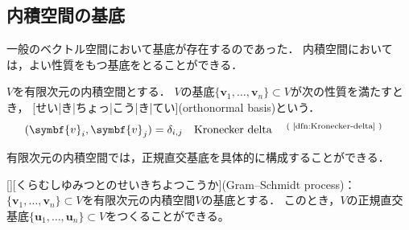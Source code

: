 \documentclass[../sotsu.tex]{subfiles}
\begin{document}
\subsection{内積空間の基底}

一般のベクトル空間において基底が存在するのであった．
内積空間においては，よい性質をもつ基底をとることができる．

\begin{definition}[正規直交基底]
    $V$を有限次元の内積空間とする．
    $V$の基底$ \{ \symbf{v}_1, \dots, \symbf{v}_n \} \subset V$が次の性質を満たすとき，
    [せい|き|ちょっ|こう|き|てい](orthonormal basis)という．
    \begin{equation*}
        (\symbf{v}_i, \symbf{v}_j) = \delta_{i,j} 
            \quad \text{Kronecker delta\refdfn{dfn:Kronecker-delta}}
    \end{equation*}
\end{definition}

有限次元の内積空間では，正規直交基底を具体的に構成することができる．

\begin{theorem}
    [][くらむしゆみつとのせいきちよつこうか](Gram–Schmidt process)：
    $ \{ \symbf{v}_1, \dots, \symbf{v}_n \} \subset V$を有限次元の内積空間$V$の基底とする．
    このとき，$V$の正規直交基底$ \{ \symbf{u}_1, \dots, \symbf{u}_n \} \subset V$をつくることができる。
\end{theorem}
\end{document}
